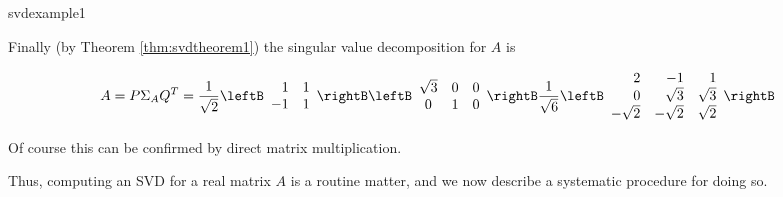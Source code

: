 \begin{example}{}{svdexample1}
\begin{solution}
\noindent Finally (by Theorem \ref{thm:svdtheorem1}) the singular value decomposition for $A$ is 

\begin{equation*}
A=P\Sigma_{A}Q^{T}=
\frac{1}{\sqrt{2}}\leftB 
\begin{array}{rr}
1 & 1 \\ 
-1 & 1
\end{array}
\rightB \leftB 
\begin{array}{ccc}
\sqrt{3} & 0 & 0 \\ 
0 & 1 & 0
\end{array}
\rightB \frac{1}{\sqrt{6}}\leftB 
\begin{array}{rrr}
2 & -1 & 1 \\ 
0 & \sqrt{3} & \sqrt{3} \\ 
-\sqrt{2} & -\sqrt{2} & \sqrt{2}
\end{array}
\rightB 
\end{equation*}

\noindent Of course this can be confirmed by direct matrix multiplication.
\end{solution}
\end{example}

Thus, computing an SVD for a real matrix $A$ is a routine matter, and we now
describe a systematic procedure for doing so.



